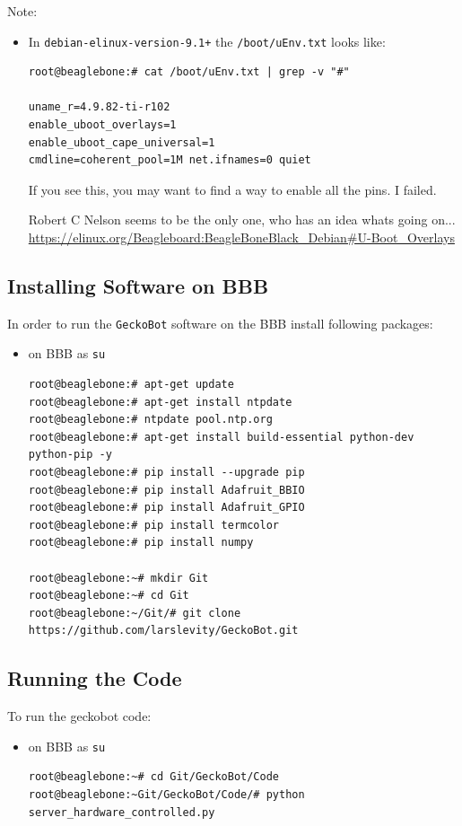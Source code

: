 \documentclass[
	fontsize=10pt
	paper=a4
]{scrartcl}
\begin{document}
Note:
\begin{footnotesize}
\begin{itemize}
\item In \texttt{debian-elinux-version-9.1+} the \texttt{/boot/uEnv.txt} looks like:
\begin{lstlisting}
root@beaglebone:# cat /boot/uEnv.txt | grep -v "#"

uname_r=4.9.82-ti-r102
enable_uboot_overlays=1
enable_uboot_cape_universal=1
cmdline=coherent_pool=1M net.ifnames=0 quiet
\end{lstlisting}

If you see this, you may want to find a way to enable all the pins. I failed.

Robert C Nelson seems to be the only one, who has an idea whats going on...
\url{https://elinux.org/Beagleboard:BeagleBoneBlack_Debian#U-Boot_Overlays}

\end{itemize}
\end{footnotesize}


\subsection{Installing Software on BBB}
In order to run the \texttt{GeckoBot} software on the BBB install following packages:
\begin{itemize}
\item on BBB as \texttt{su}
\begin{lstlisting}
root@beaglebone:# apt-get update
root@beaglebone:# apt-get install ntpdate
root@beaglebone:# ntpdate pool.ntp.org
root@beaglebone:# apt-get install build-essential python-dev python-pip -y
root@beaglebone:# pip install --upgrade pip
root@beaglebone:# pip install Adafruit_BBIO
root@beaglebone:# pip install Adafruit_GPIO
root@beaglebone:# pip install termcolor
root@beaglebone:# pip install numpy

root@beaglebone:~# mkdir Git
root@beaglebone:~# cd Git
root@beaglebone:~/Git/# git clone https://github.com/larslevity/GeckoBot.git

\end{lstlisting}
\end{itemize}



\subsection{Running the Code}
To run the geckobot code:
\begin{itemize}
\item on BBB as \texttt{su}
\begin{lstlisting}
root@beaglebone:~# cd Git/GeckoBot/Code
root@beaglebone:~Git/GeckoBot/Code/# python server_hardware_controlled.py
\end{lstlisting}
\end{itemize}
\end{document}
